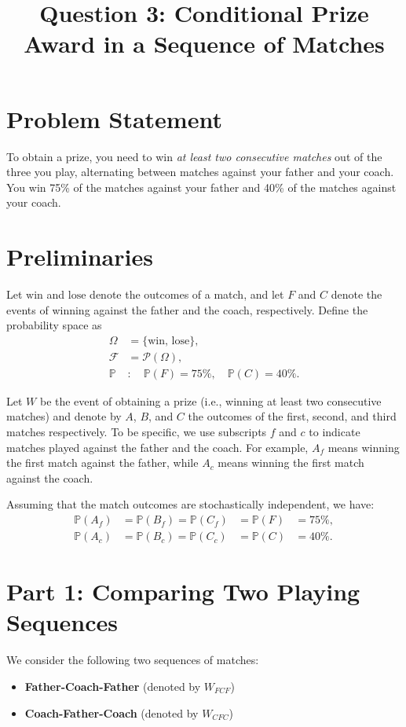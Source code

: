 \documentclass[12pt]{article}
\title{Question 3: Conditional Prize Award in a Sequence of Matches}
\author{}
\date{}
\begin{document}
\maketitle
\onehalfspacing

\section*{Problem Statement}
To obtain a prize, you need to win \emph{at least two consecutive matches} out of the three you play, alternating between matches against your father and your coach. You win 75\% of the matches against your father and 40\% of the matches against your coach.

\bigskip

\section*{Preliminaries}
Let $\mathrm{win}$ and $\mathrm{lose}$ denote the outcomes of a match, and let $F$ and $C$ denote the events of winning against the father and the coach, respectively. Define the probability space as
\[
\begin{aligned}
\Omega &= \{\mathrm{win},\,\mathrm{lose}\},\\[1mm]
\mathcal{F} &= \mathcal{P}(\Omega),\\[1mm]
\mathbb{P} &: \quad \mathbb{P}(F) = 75\%, \quad \mathbb{P}(C) = 40\%.
\end{aligned}
\]

Let $W$ be the event of obtaining a prize (i.e., winning at least two consecutive matches) and denote by $A$, $B$, and $C$ the outcomes of the first, second, and third matches respectively. To be specific, we use subscripts $f$ and $c$ to indicate matches played against the father and the coach. For example, $A_f$ means winning the first match against the father, while $A_c$ means winning the first match against the coach.

Assuming that the match outcomes are stochastically independent, we have:
\[
\begin{alignedat}{4}
\mathbb{P}(A_f) &= \mathbb{P}(B_f) = \mathbb{P}(C_f) &= \mathbb{P}(F) &= 75\%,\\[1mm]
\mathbb{P}(A_c) &= \mathbb{P}(B_c) = \mathbb{P}(C_c) &= \mathbb{P}(C) &= 40\%.
\end{alignedat}
\]

\bigskip

\section*{Part 1: Comparing Two Playing Sequences}
We consider the following two sequences of matches:
\begin{itemize}
    \item \textbf{Father-Coach-Father} (denoted by $W_{FCF}$)
    \item \textbf{Coach-Father-Coach} (denoted by $W_{CFC}$)
\end{itemize}
\end{document}
